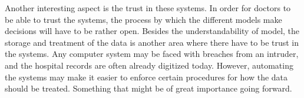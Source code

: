 Another interesting aspect is the trust in these systems.
In order for doctors to be able to trust the systems, the process by which the different models make decisions will have to be rather open.
Besides the understandability of model, the storage and treatment of the data is another area where there have to be trust in the systems.
Any computer system may be faced with breaches from an intruder, and the hospital records are often already digitized today.
However, automating the systems may make it easier to enforce certain procedures for how the data should be treated.
Something that might be of great importance going forward.
